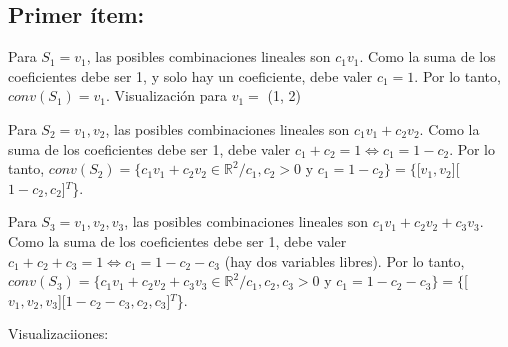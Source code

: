 \documentclass{article}
\begin{document}
\subsection*{Primer ítem:}
Para $S_1 = {v_1}$, las posibles combinaciones lineales son $c_1 v_1$. Como la suma de los coeficientes debe ser 1, y solo hay un coeficiente, debe valer $c_1 = 1$. Por lo tanto, $conv(S_1) = {v_1}$. Visualización para $v_1 =$ (1, 2)
 
Para $S_2 = {v_1, v_2}$, las posibles combinaciones lineales son $c_1 v_1 + c_2 v_2$. Como la suma de los coeficientes debe ser 1, debe valer $c_1 + c_2= 1 \iff c_1 = 1 - c_2$. Por lo tanto, $conv(S_2) = \{c_1 v_1+ c_2 v_2 \in \mathbb{R}^2 / c_1, c_2 > 0$ y $ c_1 = 1- c_2\} = \{$[$v_1, v_2$][$1-c_2, c_2$]$^T$\}.

Para $S_3 = {v_1, v_2, v_3}$, las posibles combinaciones lineales son $c_1 v_1 + c_2 v_2 + c_3 v_3$. Como la suma de los coeficientes debe ser 1, debe valer $c_1 + c_2 + c_3 = 1 \iff c_1 = 1 - c_2 - c_3$ (hay dos variables libres). Por lo tanto, $conv(S_3) = \{c_1 v_1+ c_2 v_2 + c_3 v_3\in \mathbb{R}^2 / c_1, c_2, c_3 > 0$ y $ c_1 = 1- c_2-c_3\} = \{$[$v_1, v_2, v_3$][$1-c_2 - c_3, c_2, c_3$]$^T$\}.

Visualizaciiones:
\end{document}
